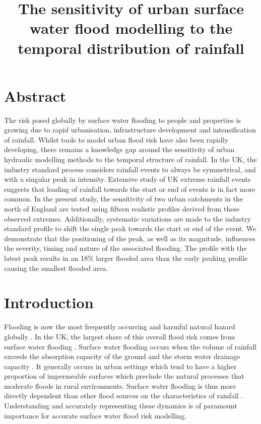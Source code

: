 \documentclass[APA,Times2COL]{WileyNJDv5}
\title{\textbf{The sensitivity of urban surface water flood modelling to the temporal distribution of rainfall}}
\date{}
\begin{document}
\maketitle
\vspace{-1.5cm}

\section{Abstract}

The risk posed globally by surface water flooding to people and properties is growing due to rapid urbanisation, infrastructure development and intensification of rainfall. Whilst tools to model urban flood risk have also been rapidly developing, there remains a knowledge gap around the sensitivity of urban hydraulic modelling methods to the temporal structure of rainfall. In the UK, the industry standard process considers rainfall events to always be symmetrical, and with a singular peak in intensity. Extensive study of UK extreme rainfall events suggests that loading of rainfall towards the start or end of events is in fact more common. In the present study, the sensitivity of two urban catchments in the north of England are tested using fifteen realistic profiles derived from these observed extremes. Additionally, systematic variations are made to the industry standard profile to shift the single peak towards the start or end of the event. We demonstrate that the positioning of the peak, as well as its magnitude, influences the severity, timing and nature of the associated flooding. The profile with the latest peak results in an 18\% larger flooded area than the early peaking profile causing the smallest flooded area.


\section{Introduction}\label{sec:introduction}

Flooding is now the most frequently occurring and harmful natural hazard globally \citep{jenkins2018probabilistic, razavi2020anthropocene}. In the UK, the largest share of this overall flood risk comes from surface water flooding \citep{houston2011pluvial}. Surface water flooding occurs when the volume of rainfall exceeds the absorption capacity of the ground and the storm water drainage capacity \citep{archer_characterising_2015}. It generally occurs in urban settings which tend to have a higher proportion of impermeable surfaces which preclude the natural processes that moderate floods in rural environments. Surface water flooding is thus more directly dependent than other flood sources on the characteristics of rainfall \citep{ochoa2015impact}. Understanding and accurately representing these dynamics is of paramount importance for accurate surface water flood risk modelling.
\end{document}
